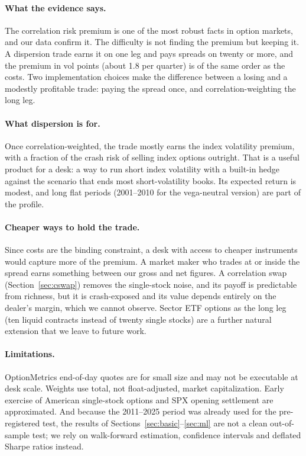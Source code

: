 \paragraph{What the evidence says.} The correlation risk premium is one of the most robust facts in option markets, and our data confirm it. The difficulty is not finding the premium but keeping it. A dispersion trade earns it on one leg and pays spreads on twenty or more, and the premium in vol points (about 1.8 per quarter) is of the same order as the costs. Two implementation choices make the difference between a losing and a modestly profitable trade: paying the spread once, and correlation-weighting the long leg.

\paragraph{What dispersion is for.} Once correlation-weighted, the trade mostly earns the index volatility premium, with a fraction of the crash risk of selling index options outright. That is a useful product for a desk: a way to run short index volatility with a built-in hedge against the scenario that ends most short-volatility books. Its expected return is modest, and long flat periods (2001--2010 for the vega-neutral version) are part of the profile.

\paragraph{Cheaper ways to hold the trade.} Since costs are the binding constraint, a desk with access to cheaper instruments would capture more of the premium. A market maker who trades at or inside the spread earns something between our gross and net figures. A correlation swap (Section~\ref{sec:cswap}) removes the single-stock noise, and its payoff is predictable from richness, but it is crash-exposed and its value depends entirely on the dealer's margin, which we cannot observe. Sector ETF options as the long leg (ten liquid contracts instead of twenty single stocks) are a further natural extension that we leave to future work.

\paragraph{Limitations.} OptionMetrics end-of-day quotes are for small size and may not be executable at desk scale. Weights use total, not float-adjusted, market capitalization. Early exercise of American single-stock options and SPX opening settlement are approximated. And because the 2011--2025 period was already used for the pre-registered test, the results of Sections~\ref{sec:basic}--\ref{sec:ml} are not a clean out-of-sample test; we rely on walk-forward estimation, confidence intervals and deflated Sharpe ratios instead.


